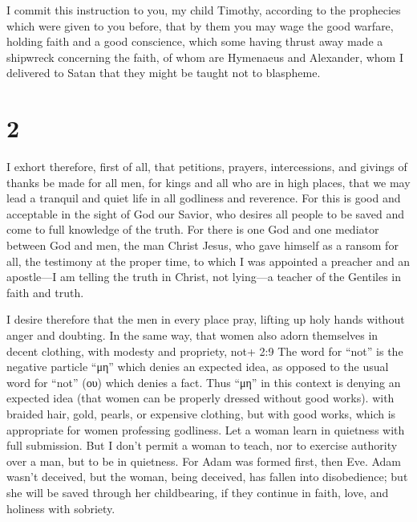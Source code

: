  I commit this instruction to you, my child Timothy,
according to the prophecies which were given to you before, that by them
you may wage the good warfare,  holding faith and a good
conscience, which some having thrust away made a shipwreck concerning
the faith,  of whom are Hymenaeus and Alexander, whom I
delivered to Satan that they might be taught not to blaspheme.

\hypertarget{section-1}{%
\section{2}\label{section-1}}

 I exhort therefore, first of all, that petitions, prayers,
intercessions, and givings of thanks be made for all men, 
for kings and all who are in high places, that we may lead a tranquil
and quiet life in all godliness and reverence.  For this is
good and acceptable in the sight of God our Savior,  who
desires all people to be saved and come to full knowledge of the truth.
 For there is one God and one mediator between God and men,
the man Christ Jesus,  who gave himself as a ransom for all,
the testimony at the proper time,  to which I was appointed
a preacher and an apostle---I am telling the truth in Christ, not
lying---a teacher of the Gentiles in faith and truth.

 I desire therefore that the men in every place pray,
lifting up holy hands without anger and doubting.  In the
same way, that women also adorn themselves in decent clothing, with
modesty and propriety, not+ 2:9 The word for ``not'' is the negative
particle ``μη'' which denies an expected idea, as opposed to the usual
word for ``not'' (ου) which denies a fact. Thus ``μη'' in this context
is denying an expected idea (that women can be properly dressed without
good works). with braided hair, gold, pearls, or expensive clothing,
 but with good works, which is appropriate for women
professing godliness.  Let a woman learn in quietness with
full submission.  But I don't permit a woman to teach, nor
to exercise authority over a man, but to be in quietness. 
For Adam was formed first, then Eve.  Adam wasn't deceived,
but the woman, being deceived, has fallen into disobedience;
 but she will be saved through her childbearing, if they
continue in faith, love, and holiness with sobriety.

